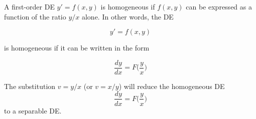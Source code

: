 A first-order DE $y' = f(x,y)$ is homogeneous if $f(x,y)$ can be expressed as a function 
of the ratio $y/x$ alone. In other words, the DE 

\begin{equation}
    y' = f(x,y)
\end{equation}

is homogeneous if it can be written in the form 

\begin{equation}
    \frac{dy}{dx} = F \biggl( \frac{y}{x}\biggr)
\end{equation}

\begin{theorem}
    The substitution $v = y/x$ (or $v = x/y$) will reduce the homogeneous DE 
    \begin{equation}
        \frac{dy}{dx} = F\biggl(\frac{y}{x}\biggr)
    \end{equation}
    to a separable DE.
\end{theorem}


